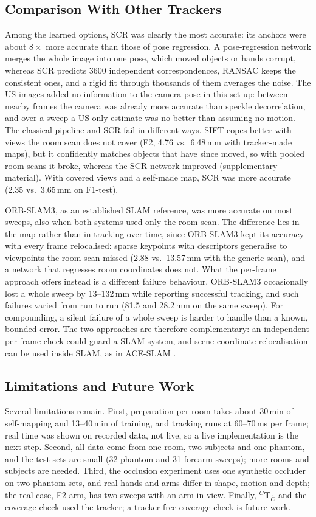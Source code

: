 \documentclass[9pt,shortpaper,twoside,web]{ieeecolor2}
\newcommand{\Tf}[2]{{}^{#1}\mathbf{T}_{#2}}
\newcommand{\Ch}{\hat{C}}%
\newcommand{\Tcorr}{\Tf{C}{\Ch}}%
\newcommand{\Ftest}{F1-test}
\newcommand{\Ftwo}{F2}
\newcommand{\Farm}{F2-arm}
\begin{document}
\subsection{Comparison With Other Trackers}
Among the learned options, SCR was clearly the most accurate: its anchors were about $8\times$ more accurate than those of pose regression. A pose-regression network merges the whole image into one pose, which moved objects or hands corrupt, whereas SCR predicts 3600 independent correspondences, RANSAC keeps the consistent ones, and a rigid fit through thousands of them averages the noise. The US images added no information to the camera pose in this set-up: between nearby frames the camera was already more accurate than speckle decorrelation, and over a sweep a US-only estimate was no better than assuming no motion. The classical pipeline and SCR fail in different ways. SIFT copes better with views the room scan does not cover (\Ftwo{}, 4.76 vs.\ 6.48\,mm with tracker-made maps), but it confidently matches objects that have since moved, so with pooled room scans it broke, whereas the SCR network improved (supplementary material). With covered views and a self-made map, SCR was more accurate (2.35 vs.\ 3.65\,mm on \Ftest{}).

ORB-SLAM3, as an established SLAM reference, was more accurate on most sweeps, also when both systems used only the room scan. The difference lies in the map rather than in tracking over time, since ORB-SLAM3 kept its accuracy with every frame relocalised: sparse keypoints with descriptors generalise to viewpoints the room scan missed (2.88 vs.\ 13.57\,mm with the generic scan), and a network that regresses room coordinates does not. What the per-frame approach offers instead is a different failure behaviour. ORB-SLAM3 occasionally lost a whole sweep by 13--132\,mm while reporting successful tracking, and such failures varied from run to run (81.5 and 28.2\,mm on the same sweep). For compounding, a silent failure of a whole sweep is harder to handle than a known, bounded error. The two approaches are therefore complementary: an independent per-frame check could guard a SLAM system, and scene coordinate relocalisation can be used inside SLAM, as in ACE-SLAM \cite{alzugaray2025aceslam}.

\subsection{Limitations and Future Work}
Several limitations remain. First, preparation per room takes about 30\,min of self-mapping and 13--40\,min of training, and tracking runs at 60--70\,ms per frame; real time was shown on recorded data, not live, so a live implementation is the next step. Second, all data come from one room, two subjects and one phantom, and the test sets are small (32 phantom and 31 forearm sweeps); more rooms and subjects are needed. Third, the occlusion experiment uses one synthetic occluder on two phantom sets, and real hands and arms differ in shape, motion and depth; the real case, \Farm{}, has two sweeps with an arm in view. Finally, $\Tcorr$ and the coverage check used the tracker; a tracker-free coverage check is future work.
\end{document}
